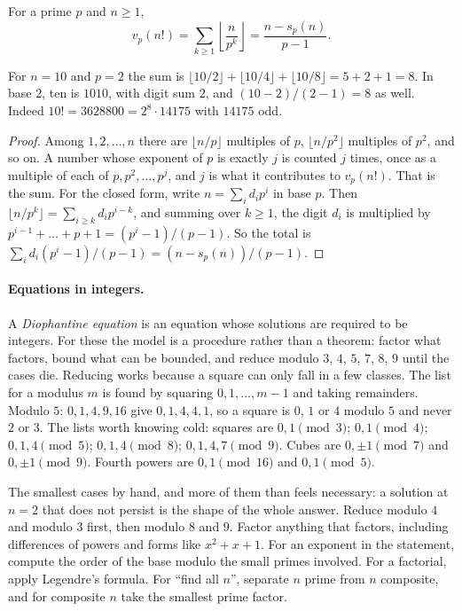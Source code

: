 \begin{theorem}
For a prime $p$ and $n \ge 1$,
\[
v_p(n!) = \sum_{k \ge 1} \left\lfloor \frac{n}{p^k} \right\rfloor = \frac{n - s_p(n)}{p - 1}.
\]
\end{theorem}

For $n = 10$ and $p = 2$ the sum is $\lfloor 10/2 \rfloor + \lfloor 10/4 \rfloor + \lfloor 10/8 \rfloor = 5 + 2 + 1 = 8$. In base $2$, ten is $1010$, with digit sum $2$, and $(10 - 2)/(2 - 1) = 8$ as well. Indeed $10! = 3628800 = 2^8 \cdot 14175$ with $14175$ odd.

\begin{proof}
Among $1, 2, \dots, n$ there are $\lfloor n/p \rfloor$ multiples of $p$, $\lfloor n/p^2 \rfloor$ multiples of $p^2$, and so on. A number whose exponent of $p$ is exactly $j$ is counted $j$ times, once as a multiple of each of $p, p^2, \dots, p^j$, and $j$ is what it contributes to $v_p(n!)$. That is the sum. For the closed form, write $n = \sum_i d_i p^i$ in base $p$. Then $\lfloor n / p^k \rfloor = \sum_{i \ge k} d_i p^{i-k}$, and summing over $k \ge 1$, the digit $d_i$ is multiplied by $p^{i-1} + \dots + p + 1 = (p^i - 1)/(p - 1)$. So the total is $\sum_i d_i (p^i - 1)/(p - 1) = (n - s_p(n))/(p - 1)$.
\end{proof}

\paragraph{Equations in integers.} A \emph{Diophantine equation} is an equation whose solutions are required to be integers. For these the model is a procedure rather than a theorem: factor what factors, bound what can be bounded, and reduce modulo $3$, $4$, $5$, $7$, $8$, $9$ until the cases die. Reducing works because a square can only fall in a few classes. The list for a modulus $m$ is found by squaring $0, 1, \dots, m - 1$ and taking remainders. Modulo $5$: $0, 1, 4, 9, 16$ give $0, 1, 4, 4, 1$, so a square is $0$, $1$ or $4$ modulo $5$ and never $2$ or $3$. The lists worth knowing cold: squares are $0, 1 \pmod 3$; $0, 1 \pmod 4$; $0, 1, 4 \pmod 5$; $0, 1, 4 \pmod 8$; $0, 1, 4, 7 \pmod 9$. Cubes are $0, \pm 1 \pmod 7$ and $0, \pm 1 \pmod 9$. Fourth powers are $0, 1 \pmod{16}$ and $0, 1 \pmod 5$.

\begin{firstmoves}
The smallest cases by hand, and more of them than feels necessary: a solution at $n = 2$ that does not persist is the shape of the whole answer. Reduce modulo $4$ and modulo $3$ first, then modulo $8$ and $9$. Factor anything that factors, including differences of powers and forms like $x^2 + x + 1$. For an exponent in the statement, compute the order of the base modulo the small primes involved. For a factorial, apply Legendre's formula. For ``find all $n$'', separate $n$ prime from $n$ composite, and for composite $n$ take the smallest prime factor.
\end{firstmoves}


